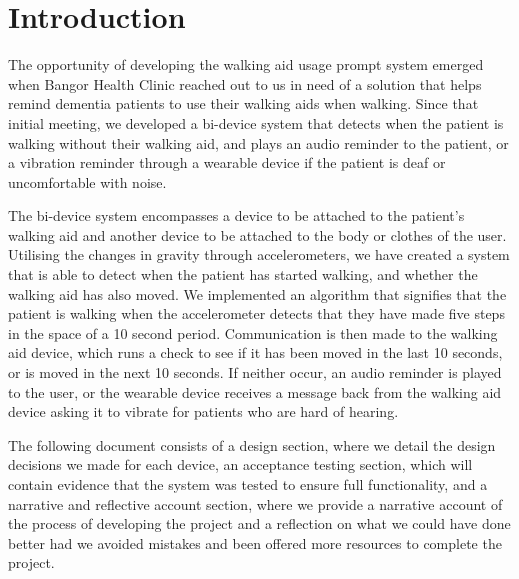 \chapter{Introduction}

The opportunity of developing the walking aid usage prompt system emerged when Bangor Health Clinic reached out to us in need of a solution that helps remind dementia patients to use their walking aids when walking. Since that initial meeting, we developed a bi-device system that detects when the patient is walking without their walking aid, and plays an audio reminder to the patient, or a vibration reminder through a wearable device if the patient is deaf or uncomfortable with noise. 

The bi-device system encompasses a device to be attached to the patient's walking aid and another device to be attached to the body or clothes of the user. Utilising the changes in gravity through accelerometers, we have created a system that is able to detect when the patient has started walking, and whether the walking aid has also moved. We implemented an algorithm that signifies that the patient is walking when the accelerometer detects that they have made five steps in the space of a 10 second period. Communication is then made to the walking aid device, which runs a check to see if it has been moved in the last 10 seconds, or is moved in the next 10 seconds. If neither occur, an audio reminder is played to the user, or the wearable device receives a message back from the walking aid device asking it to vibrate for patients who are hard of hearing. 

The following document consists of a design section, where we detail the design decisions we made for each device, an acceptance testing section, which will contain evidence that the system was tested to ensure full functionality, and a narrative and reflective account section, where we provide a narrative account of the process of developing the project and a reflection on what we could have done better had we avoided mistakes and been offered more resources to complete the project.